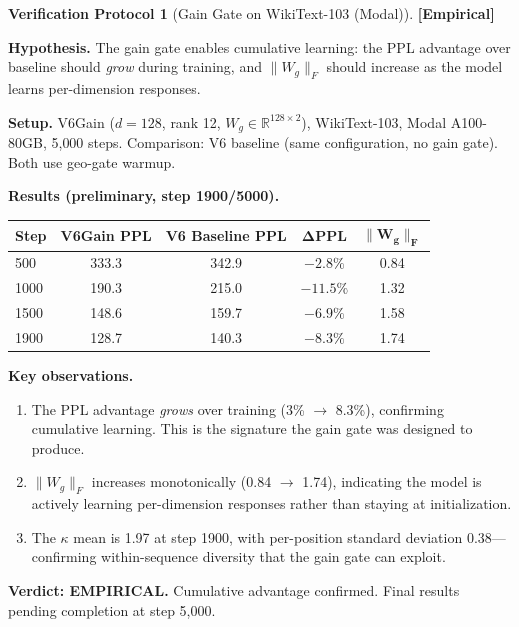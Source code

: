 \documentclass[11pt,a4paper]{article}
\theoremstyle{definition}
\newtheorem{protocol}[theorem]{Verification Protocol}
\theoremstyle{remark}
\newcommand{\statusempirical}{\textcolor{purple!70!black}{\textbf{[Empirical]}}}
\begin{document}
\begin{protocol}[Gain Gate on WikiText-103 (Modal)]
\label{prot:gain_gate_modal}
\statusempirical

\textbf{Hypothesis.} The gain gate enables cumulative learning: 
the PPL advantage over baseline should \emph{grow} during training, 
and $\|W_g\|_F$ should increase as the model learns per-dimension 
responses.

\textbf{Setup.} V6Gain ($d = 128$, rank 12, $W_g \in 
\mathbb{R}^{128 \times 2}$), WikiText-103, Modal A100-80GB, 
5{,}000 steps. Comparison: V6 baseline (same configuration, 
no gain gate). Both use geo-gate warmup.

\textbf{Results (preliminary, step 1900/5000).}
\begin{center}
\begin{tabular}{lcccc}
\toprule
\textbf{Step} & \textbf{V6Gain PPL} & \textbf{V6 Baseline PPL} & 
$\bm{\Delta}$\textbf{PPL} & $\bm{\|W_g\|_F}$ \\
\midrule
500 & 333.3 & 342.9 & $-2.8\%$ & 0.84 \\
1000 & 190.3 & 215.0 & $-11.5\%$ & 1.32 \\
1500 & 148.6 & 159.7 & $-6.9\%$ & 1.58 \\
1900 & 128.7 & 140.3 & $-8.3\%$ & 1.74 \\
\bottomrule
\end{tabular}
\end{center}

\textbf{Key observations.}
\begin{enumerate}[nosep,label=(\roman*)]
    \item The PPL advantage \emph{grows} over training 
    (3\% $\to$ 8.3\%), confirming cumulative learning. 
    This is the signature the gain gate was designed to produce.
    
    \item $\|W_g\|_F$ increases monotonically (0.84 $\to$ 1.74), 
    indicating the model is actively learning per-dimension 
    responses rather than staying at initialization.
    
    \item The $\kappa$ mean is 1.97 at step 1900, with 
    per-position standard deviation 0.38---confirming 
    within-sequence diversity that the gain gate can exploit.
\end{enumerate}

\textbf{Verdict: EMPIRICAL.} Cumulative advantage confirmed. 
Final results pending completion at step 5{,}000.
\end{protocol}
\end{document}
